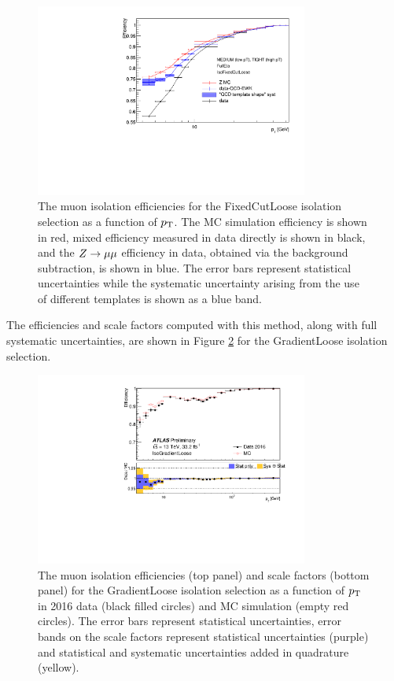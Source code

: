 \begin{figure}[h!]
  \centering
  \includegraphics[width=0.8\textwidth]{figures/muons/subtraction}
  \caption[Muon isolation efficiencies]{The muon isolation efficiencies
  for the FixedCutLoose isolation selection as a function of $p_{\text{T}}$.
  The MC simulation efficiency is shown in red, mixed efficiency measured
  in data directly is shown in black, and the $Z \rightarrow \mu\mu$ efficiency
  in data, obtained via the background subtraction, is shown in blue.
  The error bars represent statistical uncertainties while the systematic uncertainty arising from
  the use of different templates is shown as a blue band.}
  \label{fig:muon:sub}
\end{figure}
The efficiencies and scale factors computed with this method, along with
full systematic uncertainties, are shown in Figure \ref{fig:muon:sf} for
the GradientLoose isolation selection.
\begin{figure}[h!]
  \centering
  \includegraphics[width=0.8\textwidth]{figures/muons/sf}
  \caption[Muon isolation scale factors]{The muon isolation efficiencies
  (top panel) and scale factors (bottom panel) for the GradientLoose
  isolation selection as a function of $p_{\text{T}}$ in 2016 data (black filled
  circles) and MC simulation (empty red circles). The error bars represent
  statistical uncertainties, error bands on the scale factors represent
  statistical uncertainties (purple) and statistical and systematic
  uncertainties added in quadrature (yellow).
  }
  \label{fig:muon:sf}
\end{figure}
